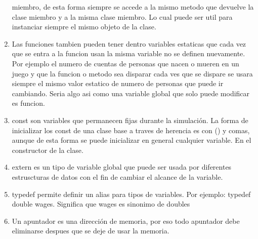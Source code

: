\documentclass[10pt,a4paper,oneside]{book}
\begin{document}
\begin{enumerate}
  miembro, de esta forma siempre se accede a la mismo metodo que
  devuelve la clase miembro y a la misma clase miembro. Lo cual puede
  ser util para instanciar siempre el mismo objeto de la clase.
\item Las funciones tambien pueden tener dentro variables estaticas
  que cada vez que se entra a la funcion usan la misma variable no se
  definen nuevamente. Por ejemplo el numero de cuentas de personas que
  nacen o mueren en un juego y que la funcion o metodo sea disparar
  cada ves que se dispare se usara siempre el mismo valor estatico de
  numero de personas que puede ir cambiando. Seria algo asi como una
  variable global que solo puede modificar es funcion.
\item const son variables que permanecen fijas durante la simulación.
  La forma de inicializar los const de una clase base a traves de
  herencia es con () y comas, aunque de esta forma se puede
  inicializar en general cualquier variable. En el constructor de la
  clase.
\item extern es un tipo de variable global que puede ser usada por
  diferentes estruscturas de datos con el fin de cambiar el alcance de
  la variable.
\item typedef permite definir un alias para tipos de variables. Por
  ejemplo: typedef double wages. Significa que wages es sinonimo de
  doubles
\item Un apuntador es una dirección de memoria, por eso todo apuntador
  debe eliminarse despues que se deje de usar la memoria.
\end{enumerate}
\end{document}
